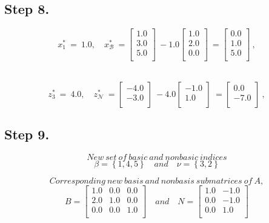 \subsection{Step 8.}
\[
x_{1}^{*}\ =\ 1.0, \quad x_{\mathcal B}^{*}\ =\begin{bmatrix}
1.0 \\ 3.0 \\ 5.0 \\ 
\end{bmatrix}\ -1.0\begin{bmatrix}
1.0 \\ 2.0 \\ 0.0 \\ 
\end{bmatrix}\ =\begin{bmatrix}
0.0 \\ 1.0 \\ 5.0 \\ 
\end{bmatrix}\ ,
\]
\

\[
z_{3}^{*}\ =\ 4.0, \quad z_{\mathcal N}^{*}\ =\begin{bmatrix}
-4.0 \\ -3.0 \\ 
\end{bmatrix}\ -4.0\begin{bmatrix}
-1.0 \\ 1.0 \\ 
\end{bmatrix}\ =\begin{bmatrix}
0.0 \\ -7.0 \\ 
\end{bmatrix}\ ,
\]
\subsection{Step 9.}

\[ New\ set\  of\  basic\  and\  nonbasic\  indices \]
\[
\beta= \left\{1, 4, 5\right\} \quad and \quad  \nu=\left\{3, 2\right\}
\]

\[
Corresponding\ new\ basis\ and\ nonbasis\ submatrices\ of\ A,
\]
\[
B =
\begin{bmatrix}
1.0 & 0.0 & 0.0 \\ 2.0 & 1.0 & 0.0 \\ 0.0 & 0.0 & 1.0 \\ 
\end{bmatrix} \quad and \quad
\mathit{N} =
\begin{bmatrix}
1.0 & -1.0 \\ 0.0 & -1.0 \\ 0.0 & 1.0 \\ 
\end{bmatrix}
\]

